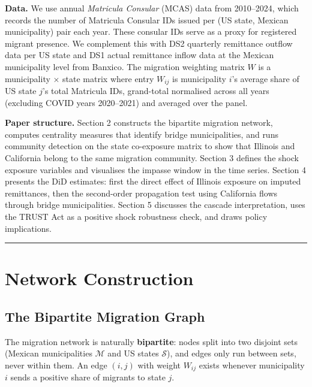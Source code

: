 \documentclass[
  11pt,
  letterpaper,
  DIV=11,
  numbers=noendperiod]{scrartcl}
\begin{document}
\textbf{Data.} We use annual \emph{Matricula Consular} (MCAS) data from
2010--2024, which records the number of Matricula Consular IDs issued
per (US state, Mexican municipality) pair each year. These consular IDs
serve as a proxy for registered migrant presence. We complement this
with DS2 quarterly remittance outflow data per US state and DS1 actual
remittance inflow data at the Mexican municipality level from Banxico.
The migration weighting matrix \(W\) is a municipality \(\times\) state
matrix where entry \(W_{ij}\) is municipality \(i\)'s average share of
US state \(j\)'s total Matricula IDs, grand-total normalised across all
years (excluding COVID years 2020--2021) and averaged over the panel.

\textbf{Paper structure.} Section 2 constructs the bipartite migration
network, computes centrality measures that identify bridge
municipalities, and runs community detection on the state co-exposure
matrix to show that Illinois and California belong to the same migration
community. Section 3 defines the shock exposure variables and visualises
the impasse window in the time series. Section 4 presents the DiD
estimates: first the direct effect of Illinois exposure on imputed
remittances, then the second-order propagation test using California
flows through bridge municipalities. Section 5 discusses the cascade
interpretation, uses the TRUST Act as a positive shock robustness check,
and draws policy implications.

\begin{center}\rule{0.5\linewidth}{0.5pt}\end{center}

\section{Network Construction}\label{network-construction}

\subsection{The Bipartite Migration
Graph}\label{the-bipartite-migration-graph}

The migration network is naturally \textbf{bipartite}: nodes split into
two disjoint sets (Mexican municipalities \(\mathcal{M}\) and US states
\(\mathcal{S}\)), and edges only run between sets, never within them. An
edge \((i, j)\) with weight \(W_{ij}\) exists whenever municipality
\(i\) sends a positive share of migrants to state \(j\).
\end{document}
